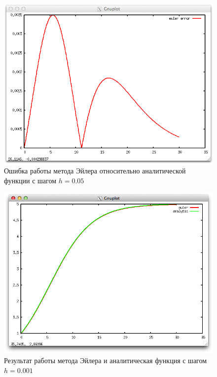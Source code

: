 \documentclass{article}
\begin{document}
  \begin{figure}
    \includegraphics[width=13cm]{eulerError005.png}
    \caption{Ошибка работы метода Эйлера относительно аналитической функции с
    шагом $h=0.05$}
  \end{figure}
  
  \begin{figure}
    \includegraphics[width=13cm]{eulerVSanalytic0001.png}
    \caption{Результат работы метода Эйлера и аналитическая функция с шагом
    $h=0.001$}
    \label{eulerVSanalytic}
  \end{figure}
  
\end{document}
